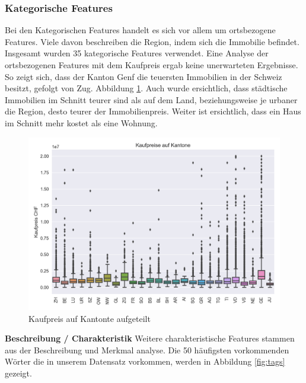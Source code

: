 \subsubsection{Kategorische Features}
Bei den Kategorischen Features handelt es sich vor allem um ortsbezogene Features. Viele davon beschreiben die Region, indem sich die Immobilie befindet.\\
Insgesamt wurden 35 kategorische Features verwendet. Eine Analyse der ortsbezogenen Features mit dem Kaufpreis ergab keine unerwarteten Ergebnisse. So zeigt sich, dass der Kanton Genf die teuersten Immobilien in der Schweiz besitzt, gefolgt von Zug. Abbildung \ref{fig:cantons}.
Auch wurde ersichtlich, dass städtische Immobilien im Schnitt teurer sind als auf dem Land, beziehungsweise je urbaner die Region, desto teurer der Immobilienpreis. Weiter ist ersichtlich, dass  ein Haus im Schnitt mehr kostet als eine Wohnung.\\[2ex]
\begin{figure}[ht]
\centering
\includegraphics[width=\textwidth]{images/boxPlot_cantons.png}
\caption[Kaufpreis auf Kantonte aufgeteilt]{Kaufpreis auf Kantonte aufgeteilt}%
\label{fig:cantons}
\end{figure}
\newline
%
\textbf{Beschreibung / Charakteristik}
Weitere charakteristische Features stammen aus der Beschreibung und Merkmal analyse. Die 50 häufigsten vorkommenden Wörter die in unserem Datensatz vorkommen, werden in Abbildung \ref{fig:tags} gezeigt. 
